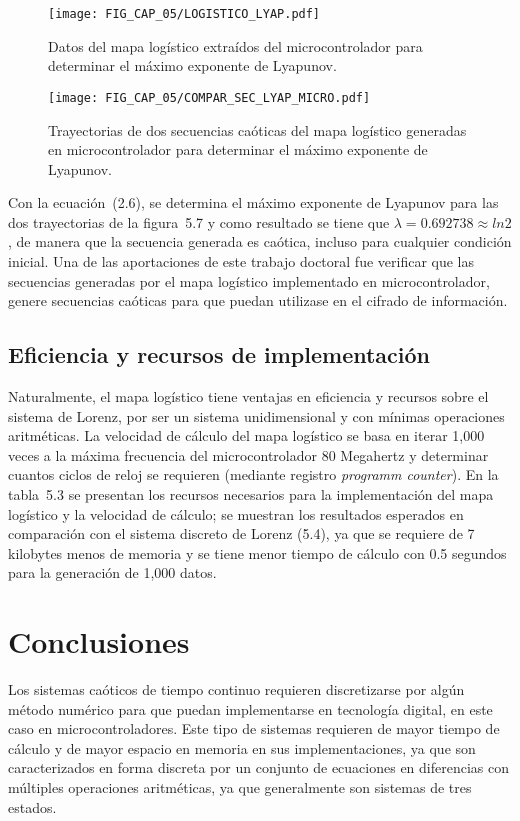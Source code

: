 \begin{figure}[!htbp] %
	\center
	\texttt{[image: FIG\_CAP\_05/LOGISTICO\_LYAP.pdf]}    
	\caption{Datos del mapa logístico extraídos del microcontrolador para determinar el máximo exponente de Lyapunov.}
\end{figure}

\begin{figure}[!htbp] %
	\center
	\texttt{[image: FIG\_CAP\_05/COMPAR\_SEC\_LYAP\_MICRO.pdf]}    
	\caption{Trayectorias de dos secuencias caóticas del mapa logístico generadas en microcontrolador para determinar el máximo exponente de Lyapunov.}
\end{figure}

Con la ecuación~(2.6), se determina el máximo exponente de Lyapunov para las dos trayectorias de la figura~5.7 y como resultado se tiene que $\lambda=0.692738\approx ln2$, de manera que la secuencia generada es caótica, incluso para cualquier condición inicial. Una de las aportaciones de este trabajo doctoral fue verificar que las secuencias generadas por el mapa logístico implementado en microcontrolador, genere secuencias caóticas para que puedan utilizase en el cifrado de información. 

\subsection{Eficiencia y recursos de implementación}
Naturalmente, el mapa logístico tiene ventajas en eficiencia y recursos sobre el sistema de Lorenz, por ser un sistema unidimensional y con mínimas operaciones aritméticas. La velocidad de cálculo del mapa logístico se basa en iterar 1,000 veces a la máxima frecuencia del microcontrolador 80 Megahertz y determinar cuantos ciclos de reloj se requieren (mediante registro \textit{programm counter}). En la tabla~5.3 se presentan los recursos necesarios para la implementación del mapa logístico y la velocidad de cálculo; se muestran los resultados esperados en comparación con el sistema discreto de Lorenz (5.4), ya que se requiere de 7 kilobytes menos de memoria y se tiene menor tiempo de cálculo con 0.5 segundos para la generación de 1,000 datos. 

\section{Conclusiones}
Los sistemas caóticos de tiempo continuo requieren discretizarse por algún método numérico para que puedan implementarse en tecnología digital, en este caso en microcontroladores. Este tipo de sistemas requieren de mayor tiempo de cálculo y de mayor espacio en memoria en sus implementaciones, ya que son caracterizados en forma discreta por un conjunto de ecuaciones en diferencias con múltiples operaciones aritméticas, ya que generalmente son sistemas de tres estados. \\

